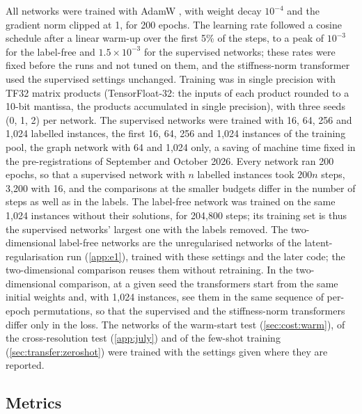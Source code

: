 All networks were trained with AdamW \cite{Loshchilov2019}, with weight decay $10^{-4}$ and
the gradient norm clipped at 1, for 200 epochs. The learning rate followed a cosine schedule
after a linear warm-up over the first 5\% of the steps, to a peak of $10^{-3}$ for the
label-free and $1.5\times10^{-3}$ for the supervised networks; these rates were fixed before
the runs and not tuned on them, and the stiffness-norm transformer used the supervised
settings unchanged. Training was in single precision with TF32 matrix products
(TensorFloat-32: the inputs of each product rounded to a 10-bit mantissa, the products
accumulated in single precision), with three seeds (0, 1, 2) per network. The supervised
networks were trained with 16, 64, 256 and 1,024 labelled instances, the first 16, 64, 256
and 1,024 instances of the training pool, the graph network with 64 and 1,024 only, a saving
of machine time fixed in the pre-registrations of September and October 2026. Every
network ran 200 epochs, so that a supervised network with $n$ labelled instances took $200n$
steps, 3,200 with 16, and the comparisons at the smaller budgets differ in the number of
steps as well as in the labels. The label-free
network was trained on the
same 1,024 instances without their solutions, for 204,800 steps; its training set is thus
the supervised networks' largest one with the labels removed. The two-dimensional
label-free networks are the unregularised networks of the latent-regularisation run
(\ref{app:e1}), trained with these settings and the later code; the two-dimensional
comparison reuses them without retraining. In the two-dimensional comparison, at a given
seed the transformers start from the same initial weights and, with 1,024 instances, see
them in the same sequence of per-epoch
permutations, so that the supervised and the stiffness-norm transformers differ only in the
loss. The networks of the warm-start test (\cref{sec:cost:warm}), of the cross-resolution
test (\ref{app:july}) and of the few-shot training (\cref{sec:transfer:zeroshot}) were
trained with the settings given where they are reported.

\subsection{Metrics}\label{sec:methods:metrics}

